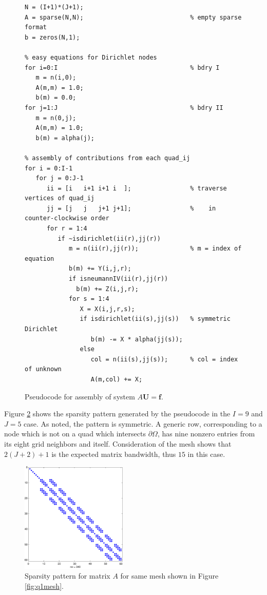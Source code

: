 \documentclass[11pt,final,reqno]{amsart}
\theoremstyle{remark}
\theoremstyle{definition}
\begin{document}
\begin{figure}
\begin{Verbatim}[xleftmargin=0.2in, frame=single, fontsize=\small]
N = (I+1)*(J+1);
A = sparse(N,N);                             % empty sparse format
b = zeros(N,1);

% easy equations for Dirichlet nodes
for i=0:I                                    % bdry I
   m = n(i,0);
   A(m,m) = 1.0;
   b(m) = 0.0;
for j=1:J                                    % bdry II
   m = n(0,j);
   A(m,m) = 1.0;
   b(m) = alpha(j);

% assembly of contributions from each quad_ij
for i = 0:I-1
   for j = 0:J-1
      ii = [i   i+1 i+1 i  ];                % traverse vertices of quad_ij
      jj = [j   j   j+1 j+1];                %    in counter-clockwise order
      for r = 1:4
         if ~isdirichlet(ii(r),jj(r))
            m = n(ii(r),jj(r));              % m = index of equation
            b(m) += Y(i,j,r);
            if isneumannIV(ii(r),jj(r))
              b(m) += Z(i,j,r);
            for s = 1:4
               X = X(i,j,r,s);
               if isdirichlet(ii(s),jj(s))   % symmetric Dirichlet
                  b(m) -= X * alpha(jj(s));
               else
                  col = n(ii(s),jj(s));      % col = index of unknown
                  A(m,col) += X;
\end{Verbatim}
\caption{Pseudocode for assembly of system $A\mathbf{U}=\mathbf{f}$.} \label{pseudoassembly}
\end{figure}

Figure \ref{fig:sparsepattern} shows the sparsity pattern generated by the pseudocode in the $I=9$ and $J=5$ case.  As noted, the pattern is symmetric.  A generic row, corresponding to a node which is not on a quad which intersects $\partial\Omega$, has nine nonzero entries from its eight grid neighbors and itself.  Consideration of the mesh shows that $2(J+2)+1$ is the expected matrix bandwidth, thus $15$ in this case.

\begin{figure}[ht] 
\includegraphics[width=0.45\textwidth]{figs/sparsepattern}
\caption{Sparsity pattern for matrix $A$ for same mesh shown in Figure \ref{fig:q1mesh}.}
\label{fig:sparsepattern}
\end{figure}
\end{document}
